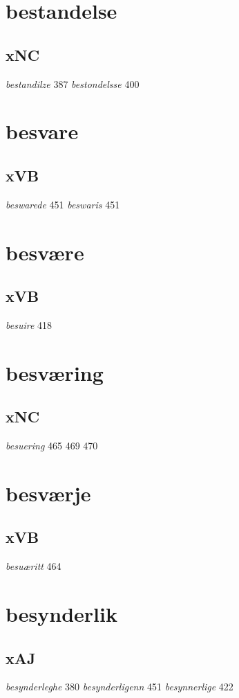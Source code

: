 \documentclass[a4paper,twocolumn]{article}
\begin{document}
\section{bestandelse}
\label{sec:org3ff7bd7}
\subsection{xNC}
\label{sec:org5c2f85a}
\emph{bestandilze} 387 \emph{bestondelsse} 400 
\section{besvare}
\label{sec:orgc323fd5}
\subsection{xVB}
\label{sec:org1b9637e}
\emph{beswarede} 451 \emph{beswaris} 451 
\section{besvære}
\label{sec:org1d46d6c}
\subsection{xVB}
\label{sec:org27bfe4e}
\emph{besuire} 418 
\section{besværing}
\label{sec:orga8331c6}
\subsection{xNC}
\label{sec:org3dbfddf}
\emph{besuering} 465 469 470 
\section{besværje}
\label{sec:org7d4b2d1}
\subsection{xVB}
\label{sec:org5d5a8f1}
\emph{besuæritt} 464 
\section{besynderlik}
\label{sec:org4406932}
\subsection{xAJ}
\label{sec:org5d5d302}
\emph{besynderleghe} 380 \emph{besynderligenn} 451 \emph{besynnerlige} 422 
\end{document}
